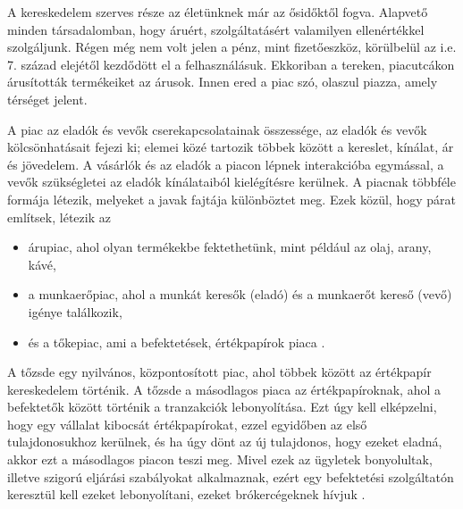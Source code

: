 A kereskedelem szerves része az életünknek már az ősidőktől fogva. Alapvető minden társadalomban, hogy áruért, szolgáltatásért valamilyen ellenértékkel szolgáljunk. Régen még nem volt jelen a pénz, mint fizetőeszköz, körülbelül az i.e. 7. század elejétől kezdődött el a felhasználásuk. Ekkoriban a tereken, piacutcákon árusították termékeiket az árusok. Innen ered a piac szó, olaszul piazza, amely térséget jelent.

A piac az eladók és vevők cserekapcsolatainak összessége, az eladók és vevők
kölcsönhatásait fejezi ki; elemei közé tartozik többek között a kereslet, kínálat, ár és jövedelem. A vásárlók és az eladók a piacon lépnek interakcióba egymással, a vevők szükségletei az eladók kínálataiból kielégítésre kerülnek. A piacnak többféle formája létezik, melyeket a javak fajtája különböztet meg. Ezek közül, hogy párat említsek, létezik az
\begin{itemize}
  \item árupiac, ahol olyan termékekbe fektethetünk, mint például az olaj, arany, kávé,
  \item a munkaerőpiac, ahol a munkát keresők (eladó) és a munkaerőt kereső (vevő) igénye találkozik,
  \item és a tőkepiac, ami a befektetések, értékpapírok piaca \cite{kozgaz}.
\end{itemize}

A tőzsde egy nyilvános, központosított piac, ahol többek között az értékpapír kereskedelem történik. A tőzsde a másodlagos piaca az értékpapíroknak, ahol a befektetők között történik a tranzakciók lebonyolítása. Ezt úgy kell elképzelni, hogy egy vállalat kibocsát értékpapírokat, ezzel egyidőben az első tulajdonosukhoz kerülnek, és ha úgy dönt az új tulajdonos, hogy ezeket eladná, akkor ezt a másodlagos piacon teszi meg. Mivel ezek az ügyletek bonyolultak, illetve szigorú eljárási szabályokat alkalmaznak, ezért egy befektetési szolgáltatón keresztül kell ezeket lebonyolítani, ezeket brókercégeknek hívjuk \cite{penziranytu}.

